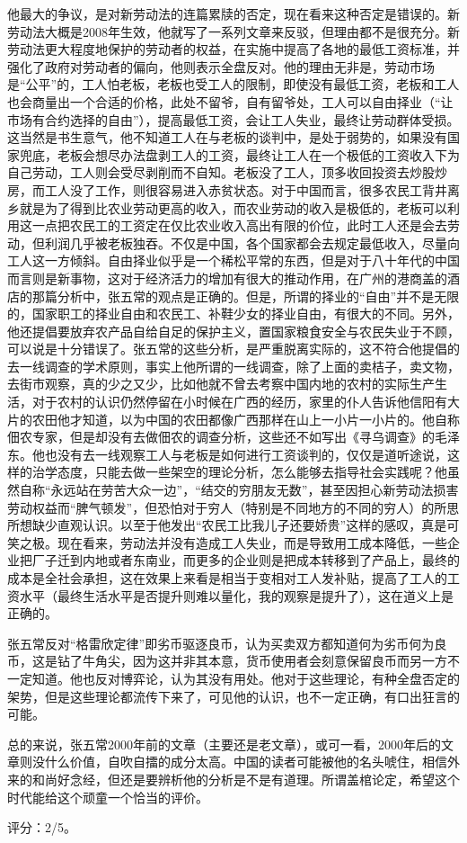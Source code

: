他最大的争议，是对新劳动法的连篇累牍的否定，现在看来这种否定是错误的。新劳动法大概是2008年生效，他就写了一系列文章来反驳，但理由都不是很充分。新劳动法更大程度地保护的劳动者的权益，在实施中提高了各地的最低工资标准，并强化了政府对劳动者的偏向，他则表示全盘反对。他的理由无非是，劳动市场是“公平”的，工人怕老板，老板也受工人的限制，即使没有最低工资，老板和工人也会商量出一个合适的价格，此处不留爷，自有留爷处，工人可以自由择业（“让市场有合约选择的自由”），提高最低工资，会让工人失业，最终让劳动群体受损。这当然是书生意气，他不知道工人在与老板的谈判中，是处于弱势的，如果没有国家兜底，老板会想尽办法盘剥工人的工资，最终让工人在一个极低的工资收入下为自己劳动，工人则会受尽剥削而不自知。老板没了工人，顶多收回投资去炒股炒房，而工人没了工作，则很容易进入赤贫状态。对于中国而言，很多农民工背井离乡就是为了得到比农业劳动更高的收入，而农业劳动的收入是极低的，老板可以利用这一点把农民工的工资定在仅比农业收入高出有限的价位，此时工人还是会去劳动，但利润几乎被老板独吞。不仅是中国，各个国家都会去规定最低收入，尽量向工人这一方倾斜。自由择业似乎是一个稀松平常的东西，但是对于八十年代的中国而言则是新事物，这对于经济活力的增加有很大的推动作用，在广州的港商盖的酒店的那篇分析中，张五常的观点是正确的。但是，所谓的择业的“自由”并不是无限的，国家职工的择业自由和农民工、补鞋少女的择业自由，有很大的不同。另外，他还提倡要放弃农产品自给自足的保护主义，置国家粮食安全与农民失业于不顾，可以说是十分错误了。张五常的这些分析，是严重脱离实际的，这不符合他提倡的去一线调查的学术原则，事实上他所谓的一线调查，除了上面的卖桔子，卖文物，去街市观察，真的少之又少，比如他就不曾去考察中国内地的农村的实际生产生活，对于农村的认识仍然停留在小时候在广西的经历，家里的仆人告诉他信阳有大片的农田他才知道，以为中国的农田都像广西那样在山上一小片一小片的。他自称佃农专家，但是却没有去做佃农的调查分析，这些还不如写出《寻乌调查》的毛泽东。他也没有去一线观察工人与老板是如何进行工资谈判的，仅仅是道听途说，这样的治学态度，只能去做一些架空的理论分析，怎么能够去指导社会实践呢？他虽然自称“永远站在劳苦大众一边”，“结交的穷朋友无数”，甚至因担心新劳动法损害劳动权益而“脾气顿发”，但恐怕对于穷人（特别是不同地方的不同的穷人）的所思所想缺少直观认识。以至于他发出“农民工比我儿子还要娇贵”这样的感叹，真是可笑之极。现在看来，劳动法并没有造成工人失业，而是导致用工成本降低，一些企业把厂子迁到内地或者东南业，而更多的企业则是把成本转移到了产品上，最终的成本是全社会承担，这在效果上来看是相当于变相对工人发补贴，提高了工人的工资水平（最终生活水平是否提升则难以量化，我的观察是提升了），这在道义上是正确的。

张五常反对“格雷欣定律”即劣币驱逐良币，认为买卖双方都知道何为劣币何为良币，这是钻了牛角尖，因为这并非其本意，货币使用者会刻意保留良币而另一方不一定知道。他也反对博弈论，认为其没有用处。他对于这些理论，有种全盘否定的架势，但是这些理论都流传下来了，可见他的认识，也不一定正确，有口出狂言的可能。

总的来说，张五常2000年前的文章（主要还是老文章），或可一看，2000年后的文章则没什么价值，自吹自擂的成分太高。中国的读者可能被他的名头唬住，相信外来的和尚好念经，但还是要辨析他的分析是不是有道理。所谓盖棺论定，希望这个时代能给这个顽童一个恰当的评价。

评分：2/5。